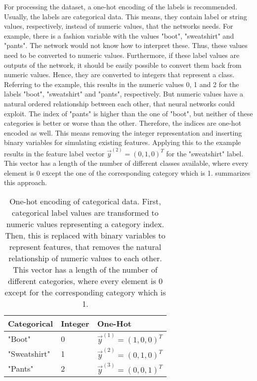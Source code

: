 For processing the dataset, a one-hot encoding \cite{Harris2012} of the labels is recommended.
Usually, the labels are categorical data.
This means, they contain label or string values, respectively, instead of numeric values, that the networks needs.
For example, there is a fashion variable with the values "boot", "sweatshirt" and "pants".
The network would not know how to interpret these.
Thus, these values need to be converted to numeric values.
Furthermore, if these label values are outputs of the network, it should be easily possible to convert them back from numeric values.
Hence, they are converted to integers that represent a class.
Referring to the example, this results in the numeric values 0, 1 and 2 for the labels "boot", "sweatshirt" and "pants", respectively.
But numeric values have a natural ordered relationship between each other, that neural networks could exploit.
The index of "pants" is higher than the one of "boot", but neither of these categories is better or worse than the other.
Therefore, the indices are one-hot encoded as well.
This means removing the integer representation and inserting binary variables for simulating existing features.
Applying this to the example results in the feature label vector $\vec{y}^{(2)} = (0, 1, 0)^T$ for the "sweatshirt" label.
This vector has a length of the number of different classes available, where every element is 0 except the one of the corresponding category which is 1.
 summarizes this approach.
\begin{table}[]
	\caption[One-Hot Encoding of Categorical Data]{One-hot encoding of categorical data. First, categorical label values are transformed to numeric values representing a category index. Then, this is replaced with binary variables to represent features, that removes the natural relationship of numeric values to each other. This vector has a length of the number of different categories, where every element is 0 except for the corresponding category which is 1.}
	\label{tab:one-hot-encoding}
	\centering
	\begin{tabular}{l|l|l}
		Categorical   & Integer & One-Hot                   \\ \hline
		"Boot"       & 0       & $\vec{y}^{(1)} = (1, 0, 0)^T$ \\
		"Sweatshirt" & 1       & $\vec{y}^{(2)} = (0, 1, 0)^T$  \\
		"Pants"      & 2       & $\vec{y}^{(3)} = (0, 0, 1)^T$
	\end{tabular}
\end{table}